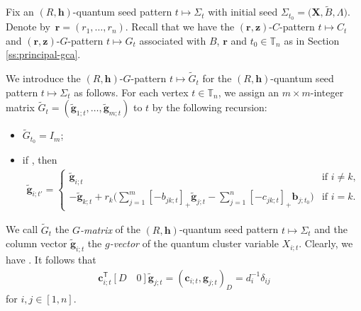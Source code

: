 Fix an $(R,\mathbf{h})$-quantum seed pattern $t\mapsto \Sigma_t$ with initial seed $\Sigma_{t_0}=\bigl(\mathbf{X},\tilde{B},\Lambda\bigr)$. Denote by~${\mathbf{r}=(r_1,\dots, r_n)}$. Recall that we have the $(\mathbf{r},\mathbf{z})$-$C$-pattern $t\mapsto C_t$ and $(\mathbf{r},\mathbf{z})$-$G$-pattern $t\mapsto G_t$ associated with $B$, $\mathbf{r}$ and $t_0\in \mathbb{T}_n$ as in Section \ref{ss:principal-gca}.

We introduce the $(R,\mathbf{h})$-$G$-pattern $t\mapsto \tilde{G}_t$ for the $(R,\mathbf{h})$-quantum seed pattern $t\mapsto \Sigma_t$ as follows.
 For each vertex $t\in \mathbb{T}_n$, we assign an $m\times m$-integer matrix $\tilde{G}_t=(\tilde{\mathbf{g}}_{1;t},\dots, \tilde{\mathbf{g}}_{m;t})$ to $t$ by the following recursion:
\begin{itemize}\itemsep=0pt
 \item[(1)] $\tilde{G}_{t_0}=I_m$;
 \item[(2)] if , then
 \begin{align}\label{eq:g-formula}
 \mathbf{\tilde{g}}_{i;t'}=
 \begin{cases}
 \mathbf{\tilde{g}}_{i;t} & \text{if } i\neq k,\\
 \displaystyle -\mathbf{\tilde{g}}_{k;t}+r_{k}\biggl(\sum\limits_{j=1}^{m}[-b_{jk;t}]_+\mathbf{\tilde{g}}_{j;t}-\sum\limits_{j=1}^{n}[- c_{jk;t}]_+\mathbf{b}_{j;t_0}\biggr) & \text{if }i=k.
 \end{cases}
 \end{align}

\end{itemize}
We call $\tilde{G}_t$ the {\it $G$-matrix} of the $(R,\mathbf{h})$-quantum seed pattern $t\mapsto \Sigma_t$ and the column vector $\tilde{\mathbf{g}}_{i;t}$ the {\it $g$-vector} of the quantum cluster variable $X_{i;t}$.
Clearly, we have . It follows that
\begin{align}\label{D_form_duality}
 \mathbf{c}^{\mathsf T}_{i;t}[D\quad 0]\mathbf{\tilde{g}}_{j;t}=(\mathbf{c}_{i;t},\mathbf{g}_{j;t})_D=d_{i}^{-1}\delta_{ij}
\end{align}
for $i,j\in[1,n]$.

